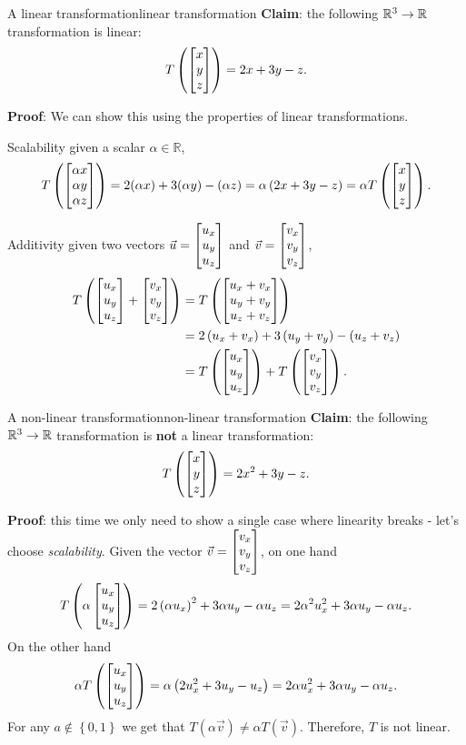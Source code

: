 \begin{example}{A linear transformation}{linear transformation}
	\textbf{Claim}: the following $\mathbb{R}^{3}\to\mathbb{R}$ transformation is linear:
	\[
		T\left(\colvec{x;y;z}\right) = 2x+3y-z.
	\]

	\textbf{Proof}: We can show this using the properties of linear transformations.
	\begin{listitemize}
	\item[Scalability] given a scalar $\alpha\in\mathbb{R}$,
		\[
			T\left(\colvec{\alpha x;\alpha y; \alpha z}\right)
			= 2(\alpha x)+3(\alpha y)-(\alpha z) = \alpha\left( 2x+3y-z \right)
			= \alpha T\left(\colvec{x;y;z}\right).
		\]
	\item[Additivity] given two vectors $\vec{u}=\colvec{u_{x};u_{y};u_{z}}$ and $\vec{v}=\colvec{v_{x};v_{y};v_{z}}$,
		\begin{align*}
			T\left( \colvec{u_{x};u_{y};u_{z}} + \colvec{v_{x};v_{y};v_{z}} \right) &= T\left( \colvec{u_{x}+v_{x};u_{y}+v_{y};u_{z}+v_{z}} \right)\\
			&= 2\left( u_{x}+v_{x} \right) +3\left( u_{y}+v_{y} \right) - \left( u_{z}+v_{z} \right)\\
			&= T\left( \colvec{u_{x};u_{y};u_{z}} \right) + T\left( \colvec{v_{x};v_{y};v_{z}} \right).
		\end{align*}
	\end{listitemize}
\end{example}

\begin{example}{A non-linear transformation}{non-linear transformation}
	\textbf{Claim}: the following $\mathbb{R}^{3}\to\mathbb{R}$ transformation is \textbf{not} a linear transformation:
	\[
		T\left(\colvec{x;y;z}\right) = 2x^{2}+3y-z.
	\]

	\textbf{Proof}: this time we only need to show a single case where linearity breaks - let's choose \textit{scalability}. Given the vector $\vec{v}=\colvec{v_{x};v_{y};v_{z}}$, on one hand
	\[
		T\left( \alpha\colvec{u_{x};u_{y};u_{z}} \right) = 2\left(\alpha u_{x}\right)^{2}+3\alpha u_{y}-\alpha u_{z} = 2\alpha^{2}u_{x}^{2}+3\alpha u_{y}-\alpha u_{z}.
	\]
	On the other hand
	\[
		\alpha T\left( \colvec{u_{x};u_{y};u_{z}} \right) = \alpha\left( 2u_{x}^{2}+3u_{y}-u_{z} \right) = 2\alpha u_{x}^{2}+3\alpha u_{y}-\alpha u_{z}.
	\]
	For any $a\notin\left\{ 0,1 \right\}$ we get that $T\left( \alpha\vec{v} \right)\neq\alpha T\left( \vec{v} \right)$. Therefore, $T$ is not linear.
\end{example}

